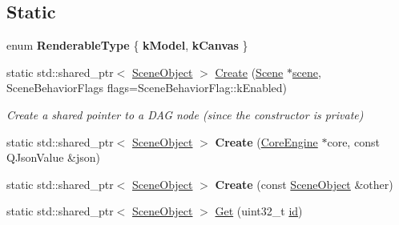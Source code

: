 \subsection*{Static}
\begin{DoxyCompactItemize}
\item 
\mbox{\label{classrev_1_1_scene_object_abffd1eda7693ff5b701208ee8b6aafe9}} 
enum {\bfseries Renderable\+Type} \{ {\bfseries k\+Model}, 
{\bfseries k\+Canvas}
 \}
\item 
\mbox{\label{classrev_1_1_scene_object_a8c2ac7b2efdc90812ea1df1be8c749e3}} 
static std\+::shared\+\_\+ptr$<$ \mbox{\hyperlink{classrev_1_1_scene_object}{Scene\+Object}} $>$ \mbox{\hyperlink{classrev_1_1_scene_object_a8c2ac7b2efdc90812ea1df1be8c749e3}{Create}} (\mbox{\hyperlink{classrev_1_1_scene}{Scene}} $\ast$\mbox{\hyperlink{classrev_1_1_scene_object_a099329842e285a99dbe08fd9b1d78004}{scene}}, Scene\+Behavior\+Flags flags=Scene\+Behavior\+Flag\+::k\+Enabled)
\begin{DoxyCompactList}\small\item\em Create a shared pointer to a D\+AG node (since the constructor is private) \end{DoxyCompactList}\item 
\mbox{\label{classrev_1_1_scene_object_a678db3e6b691df1ca129860d73ddad85}} 
static std\+::shared\+\_\+ptr$<$ \mbox{\hyperlink{classrev_1_1_scene_object}{Scene\+Object}} $>$ {\bfseries Create} (\mbox{\hyperlink{classrev_1_1_core_engine}{Core\+Engine}} $\ast$core, const Q\+Json\+Value \&json)
\item 
\mbox{\label{classrev_1_1_scene_object_ac49242a54adec6a052ac1e844099b6db}} 
static std\+::shared\+\_\+ptr$<$ \mbox{\hyperlink{classrev_1_1_scene_object}{Scene\+Object}} $>$ {\bfseries Create} (const \mbox{\hyperlink{classrev_1_1_scene_object}{Scene\+Object}} \&other)
\item 
\mbox{\label{classrev_1_1_scene_object_a0182bac59e40e7d702a1808d760e4e9f}} 
static std\+::shared\+\_\+ptr$<$ \mbox{\hyperlink{classrev_1_1_scene_object}{Scene\+Object}} $>$ \mbox{\hyperlink{classrev_1_1_scene_object_a0182bac59e40e7d702a1808d760e4e9f}{Get}} (uint32\+\_\+t \mbox{\hyperlink{classrev_1_1_dag_node_affc1f6a97703f3187ad0159709bb0681}{id}})

\end{DoxyCompactItemize}
